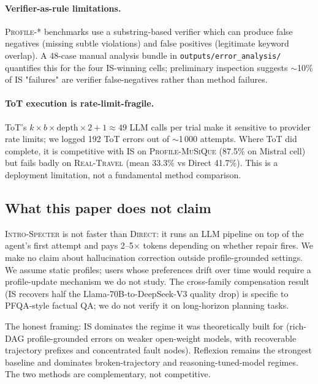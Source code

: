 \paragraph{Verifier-as-rule limitations.}
\textsc{Profile-*} benchmarks use a substring-based verifier
which can produce false negatives (missing subtle violations)
and false positives (legitimate keyword overlap). A 48-case
manual analysis bundle in \texttt{outputs/error\_analysis/}
quantifies this for the four IS-winning cells; preliminary
inspection suggests $\sim$10\% of IS "failures" are verifier
false-negatives rather than method failures.

\paragraph{ToT execution is rate-limit-fragile.}
ToT's $k \times b \times \mathrm{depth} \times 2 + 1 \approx 49$
LLM calls per trial make it sensitive to provider rate limits;
we logged 192 ToT errors out of $\sim$1\,000 attempts. Where
ToT did complete, it is competitive with IS on
\textsc{Profile-MuSiQue} (87.5\% on Mistral cell) but fails
badly on \textsc{Real-Travel} (mean 33.3\% vs Direct 41.7\%).
This is a deployment limitation, not a fundamental method
comparison.

\subsection{What this paper does not claim}

\textsc{Intro-Specter} is not faster than \textsc{Direct}: it
runs an LLM pipeline on top of the agent's first attempt and
pays 2--5$\times$ tokens depending on whether repair fires. We
make no claim about hallucination correction outside
profile-grounded settings. We assume static profiles; users
whose preferences drift over time would require a profile-update
mechanism we do not study. The cross-family compensation result
(IS recovers half the Llama-70B-to-DeepSeek-V3 quality drop) is
specific to PFQA-style factual QA; we do not verify it on
long-horizon planning tasks.

The honest framing: IS dominates the regime it was theoretically
built for (rich-DAG profile-grounded errors on weaker open-weight
models, with recoverable trajectory prefixes and concentrated
fault nodes). Reflexion remains the strongest baseline and
dominates broken-trajectory and reasoning-tuned-model regimes.
The two methods are complementary, not competitive.
